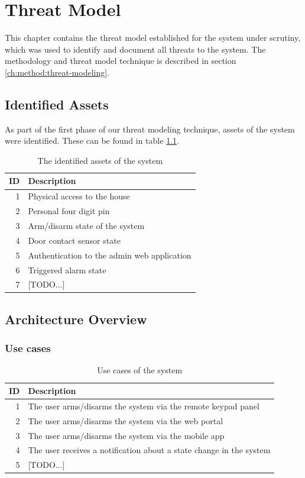\chapter{Threat Model} \label{ch:threat-model}
This chapter contains the threat model established for the system under scrutiny, which was used to identify and document all threats to the system. The methodology and threat model technique is described in section \ref{ch:method:threat-modeling}.

\section{Identified Assets}
As part of the first phase of our threat modeling technique, assets of the system were identified. These can be found in table \ref{tb:assets}.
\begin{table}[!ht]
    \centering
    \begin{tabular}{r l}
        \hline
        \textbf{ID} & \textbf{Description} \\
        \hline
        1  & Physical access to the house \\
        2  & Personal four digit pin \\
        3  & Arm/disarm state of the system \\
        4  & Door contact sensor state \\
        5  & Authentication to the admin web application \\
        6  & Triggered alarm state \\
        7  & [TODO...] \\
        \hline
    \end{tabular}
    \caption{The identified assets of the system}
    \label{tb:assets}
\end{table}

\section{Architecture Overview}
\subsection{Use cases}
\begin{table}[!ht]
    \centering
    \begin{tabularx}{\textwidth}{r X}
        \textbf{ID} & \textbf{Description}  \\
        \hline
        1  & The user arms/disarms the system via the remote keypad panel \\
        2  & The user arms/disarms the system via the web portal \\
        3  & The user arms/disarms the system via the mobile app \\
        4  & The user receives a notification about a state change in the system \\
        5  & [TODO...] \\
        \hline
    \end{tabularx}
    \caption{Use cases of the system}
    \label{tb:use-cases}
\end{table}

